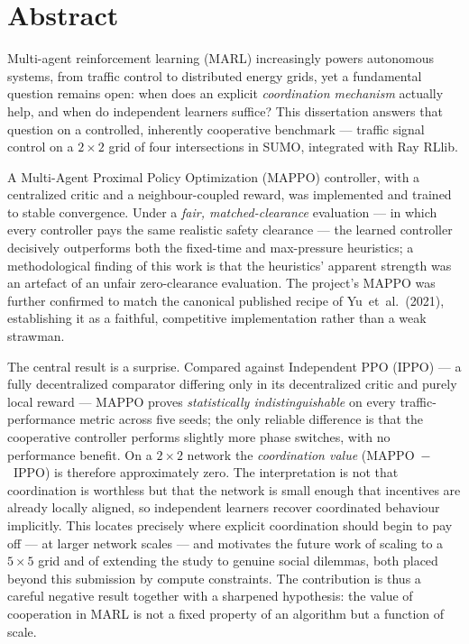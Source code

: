 \chapter*{Abstract}

Multi-agent reinforcement learning (MARL) increasingly powers autonomous systems,
from traffic control to distributed energy grids, yet a fundamental question
remains open: when does an explicit \emph{coordination mechanism} actually help, and
when do independent learners suffice? This dissertation answers that question on a
controlled, inherently cooperative benchmark --- traffic signal control on a
$2\times2$ grid of four intersections in SUMO, integrated with Ray RLlib.

A Multi-Agent Proximal Policy Optimization (MAPPO) controller, with a centralized
critic and a neighbour-coupled reward, was implemented and trained to stable
convergence. Under a \emph{fair, matched-clearance} evaluation --- in which every
controller pays the same realistic safety clearance --- the learned controller
decisively outperforms both the fixed-time and max-pressure heuristics; a
methodological finding of this work is that the heuristics' apparent strength was an
artefact of an unfair zero-clearance evaluation. The project's MAPPO was further
confirmed to match the canonical published recipe of Yu~et~al.\ (2021), establishing
it as a faithful, competitive implementation rather than a weak strawman.

The central result is a surprise. Compared against Independent PPO (IPPO) --- a fully
decentralized comparator differing only in its decentralized critic and purely local
reward --- MAPPO proves \emph{statistically indistinguishable} on every
traffic-performance metric across five seeds; the only reliable difference is that
the cooperative controller performs slightly more phase switches, with no
performance benefit. On a $2\times2$ network the \emph{coordination value}
(MAPPO~$-$~IPPO) is therefore approximately zero. The interpretation is not that
coordination is worthless but that the network is small enough that incentives are
already locally aligned, so independent learners recover coordinated behaviour
implicitly. This locates precisely where explicit coordination should begin to pay
off --- at larger network scales --- and motivates the future work of scaling to a
$5\times5$ grid and of extending the study to genuine social dilemmas, both placed
beyond this submission by compute constraints. The contribution is thus a careful
negative result together with a sharpened hypothesis: the value of cooperation in
MARL is not a fixed property of an algorithm but a function of scale.
